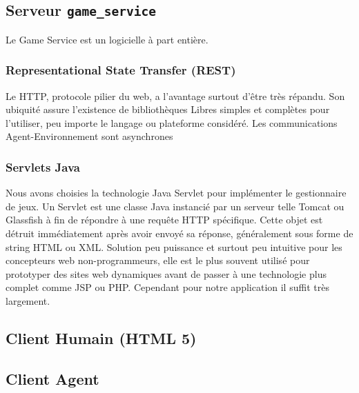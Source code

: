   
  
  
\subsection{Serveur \texttt{game\_service} }

Le Game Service est un logicielle à part entière.

\subsubsection{\og Representational State Transfer \fg{} (REST)}

Le HTTP, protocole pilier du web, a l'avantage surtout d'être très répandu. Son ubiquité assure l'existence de bibliothèques Libres simples et complètes pour l'utiliser, peu importe le langage ou plateforme considéré. 
Les communications Agent-Environnement sont asynchrones 

\subsubsection{Servlets Java}

Nous avons choisies la technologie Java Servlet pour implémenter le gestionnaire de jeux. Un Servlet est une classe Java instancié par un serveur telle Tomcat ou Glassfish à fin de répondre à une requête HTTP spécifique. Cette objet est détruit immédiatement après avoir envoyé sa réponse, généralement sous forme de string HTML ou XML.
Solution peu puissance et surtout peu intuitive pour les concepteurs web non-programmeurs, elle est le plus souvent utilisé pour prototyper des sites web dynamiques avant de passer à une technologie plus complet comme JSP ou PHP. Cependant pour notre application il suffit très largement.

\subsection{Client Humain (HTML 5)}
    
\subsection{Client Agent}
    